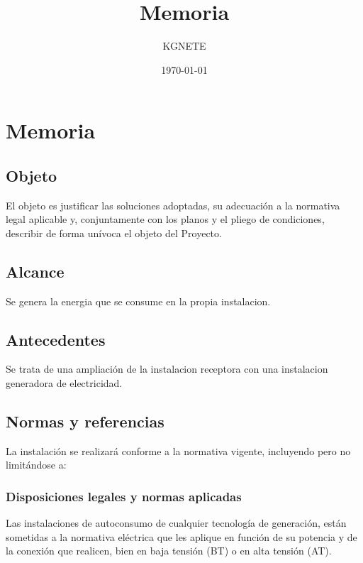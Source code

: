 \documentclass{article}
\title{Memoria}
\author{KGNETE}
\date{\today}
\begin{document}
\maketitle

\chapter{Memoria}

\section{Objeto}
El objeto es justificar las soluciones adoptadas, su adecuación a la normativa legal aplicable y, conjuntamente
con los planos y el pliego de condiciones, describir de forma unívoca el objeto del Proyecto.

\section{Alcance}

Se genera la energia que se consume en la propia instalacion.

\section{Antecedentes}

Se trata de una ampliación de la instalacion receptora con una instalacion generadora de electricidad.

\section{Normas y referencias}

La instalación se realizará conforme a la normativa vigente, incluyendo pero no limitándose a:

\subsection{Disposiciones legales y normas aplicadas}




Las instalaciones de autoconsumo de cualquier tecnología de generación, están sometidas a la normativa eléctrica que les aplique en función de su potencia y de la conexión que realicen, bien en baja tensión (BT) o en alta tensión (AT).
\end{document}
